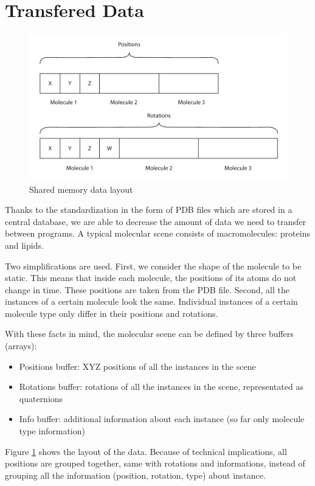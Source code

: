 \documentclass[
  digital, %
  table,   %
  nolof,     %
  nolot,     %
  oneside,
]{fithesis3}
\begin{document}
\section{Transfered Data}
\begin{figure}
  \centering
  \includegraphics[scale=0.6]{images/data-layout.pdf}
  \caption{Shared memory data layout}
  \label{fig:memory-layout}
\end{figure}

Thanks to the standardization in the form of PDB files which are stored in a central database, we are able to decrease the amount of data we need to transfer between programs. A typical molecular scene consists of macromolecules: proteins and lipids.

Two simplifications are used. First, we consider the shape of the molecule to be static. This means that inside each molecule, the positions of its atoms do not change in time. These positions are taken from the PDB file. Second, all the instances of a certain molecule look the same. Individual instances of a certain molecule type only differ in their positions and rotations.

With these facts in mind, the molecular scene can be defined by three buffers (arrays):
\begin{itemize}
\item Positions buffer: XYZ positions of all the instances in the scene
\item Rotations buffer: rotations of all the instances in the scene, representated as quaternions
\item Info buffer: additional information about each instance (so far only molecule type information)
\end{itemize}

Figure \ref{fig:memory-layout} shows the layout of the data. Because of technical implications, all positions are grouped together, same with rotations and informations, instead of grouping all the information (position, rotation, type) about instance.
\end{document}
